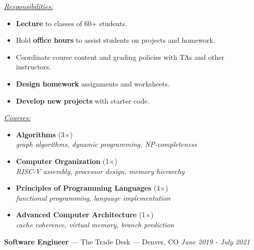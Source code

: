 \documentclass[10pt,letterpaper]{article}
\begin{document}
\vspace{4pt}
\hspace{0.01\linewidth}%
\begin{minipage}[t]{0.45\linewidth}
    \textit{\underline{Responsibilities:}}
    \begin{itemize}[topsep=5pt]
        \item \textbf{Lecture} to classes of 60+ students.
        \item Hold \textbf{office hours} to assist students on projects and
            homework.
        \item Coordinate course content and grading policies with TAs and other
            instructors.
        \item \textbf{Design homework} assignments and worksheets.
        \item \textbf{Develop new projects} with starter code.
    \end{itemize}
\end{minipage}\hfill%
\begin{minipage}[t]{0.54\linewidth}
    \textit{\underline{Courses:}}
    \begin{itemize}[topsep=5pt]
        \item \textbf{Algorithms} (3$\times$) \\
            \textit{graph algorithms, dynamic programming, NP-completeness}
        \item \textbf{Computer Organization} (1$\times$) \\
            \textit{RISC-V assembly, processor design, memory hierarchy}
        \item \textbf{Principles of Programming Languages} (4$\times$) \\
            \textit{functional programming, language implementation}
        \item \textbf{Advanced Computer Architecture} (1$\times$) \\
            \textit{cache coherence, virtual memory, branch prediction}
    \end{itemize}
\end{minipage}

\vspace{5pt}
{\fontsize{11}{0}
\textbf{Software Engineer} --- The Trade Desk --- Denver, CO}
\hfill \textit{June 2019 - July 2021}
\end{document}
